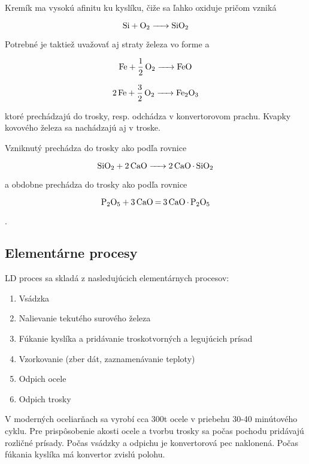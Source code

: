 Kremík ma vysokú afinitu ku kyslíku, čiže sa ľahko oxiduje pričom vzniká 

\begin{equation}
\ce{Si + O2 -> SiO2}
\end{equation}

Potrebné je taktiež uvažovať aj straty železa vo forme  a 

\begin{equation}
\ce{Fe + 1/2O2 -> FeO}
\end{equation}

\begin{equation}
\ce{2Fe + 3/2O2 -> Fe2O3}
\end{equation}

ktoré prechádzajú do trosky, resp.  odchádza v konvertorovom prachu. Kvapky kovového železa sa nachádzajú aj v troske.

Vzniknutý  prechádza do trosky ako  podľa rovnice

\begin{equation}
\ce{SiO2 + 2CaO -> 2CaO.SiO2}
\end{equation}

a obdobne  prechádza do trosky ako  podľa rovnice

\begin{equation}
\ce{P2O5 + 3CaO = 3CaO.P2O5}
\end{equation}

\cite{sprava2017}.

\newpage
\subsection{Elementárne procesy}

LD proces sa skladá z nasledujúcich elementárnych procesov:

\begin{enumerate}
	\item Vsádzka
	\item Nalievanie tekutého surového železa
	\item Fúkanie kyslíka a pridávanie troskotvorných a legujúcich prísad
	\item Vzorkovanie (zber dát, zaznamenávanie teploty)
	\item Odpich ocele
	\item Odpich trosky
\end{enumerate}

V moderných oceliarňach sa vyrobí cca 300t ocele v priebehu 30-40 minútového cyklu. Pre prispôsobenie akosti ocele a tvorbu trosky sa počas pochodu pridávajú rozličné prísady. Počas vsádzky a odpichu je konvertorová pec naklonená. Počas fúkania kyslíka má konvertor zvislú polohu.

